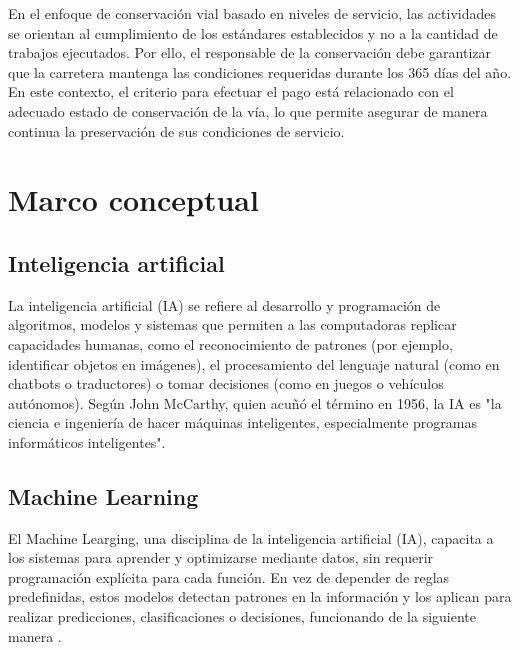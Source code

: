En el enfoque de conservación vial basado en niveles de servicio, las actividades se orientan al cumplimiento de los estándares establecidos y no a la cantidad de trabajos ejecutados. Por ello, el responsable de la conservación debe garantizar que la carretera mantenga las condiciones requeridas durante los 365 días del año. En este contexto, el criterio para efectuar el pago está relacionado con el adecuado estado de conservación de la vía, lo que permite asegurar de manera continua la preservación de sus condiciones de servicio.



\section{Marco conceptual}
\subsection{Inteligencia artificial}
La inteligencia artificial (IA) se refiere al desarrollo y programación de algoritmos, modelos y sistemas que permiten a las computadoras replicar capacidades humanas, como el reconocimiento de patrones (por ejemplo, identificar objetos en imágenes), el procesamiento del lenguaje natural (como en chatbots o traductores) o tomar decisiones (como en juegos o vehículos autónomos). Según John McCarthy, quien acuñó el término en 1956, la IA es "la ciencia e ingeniería de hacer máquinas inteligentes, especialmente programas informáticos inteligentes".
\subsection{Machine Learning}
El Machine Learging, una disciplina de la inteligencia artificial (IA), capacita a los sistemas para aprender y optimizarse mediante datos, sin requerir programación explícita para cada función. En vez de depender de reglas predefinidas, estos modelos detectan patrones en la información y los aplican para realizar predicciones, clasificaciones o decisiones, funcionando de la siguiente manera .

